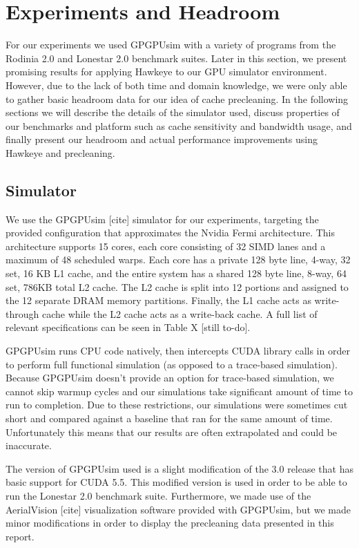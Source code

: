 \chapter{Experiments and Headroom}

For our experiments we used GPGPUsim with a variety of programs from the Rodinia 2.0 and Lonestar 2.0 benchmark suites. Later in this section, we present promising results for applying Hawkeye to our GPU simulator environment. However, due to the lack of both time and domain knowledge, we were only able to gather basic headroom data for our idea of cache precleaning. In the following sections we will describe the details of the simulator used, discuss properties of our benchmarks and platform such as cache sensitivity and bandwidth usage, and finally present our headroom and actual performance improvements using Hawkeye and precleaning.

\section{Simulator}
We use the GPGPUsim [cite] simulator for our experiments, targeting the provided configuration that approximates the Nvidia Fermi architecture. This architecture supports 15 cores, each core consisting of 32 SIMD lanes and a maximum of 48 scheduled warps. Each core has a private 128 byte line, 4-way, 32 set, 16 KB L1 cache, and the entire system has a shared 128 byte line, 8-way, 64 set, 786KB total L2 cache. The L2 cache is split into 12 portions and assigned to the 12 separate DRAM memory partitions. Finally, the L1 cache acts as write-through cache while the L2 cache acts as a write-back cache. A full list of relevant specifications can be seen in Table X [still to-do].

GPGPUsim runs CPU code natively, then intercepts CUDA library calls in order to perform full functional simulation (as opposed to a trace-based simulation). Because GPGPUsim doesn’t provide an option for trace-based simulation, we cannot skip warmup cycles and our simulations take significant amount of time to run to completion. Due to these restrictions, our simulations were sometimes cut short and compared against a baseline that ran for the same amount of time. Unfortunately this means that our results are often extrapolated and could be inaccurate.

The version of GPGPUsim used is a slight modification of the 3.0 release that has basic support for CUDA 5.5. This modified version is used in order to be able to run the Lonestar 2.0 benchmark suite. Furthermore, we made use of the AerialVision [cite] visualization software provided with GPGPUsim, but we made minor modifications in order to display the precleaning data presented in this report.

